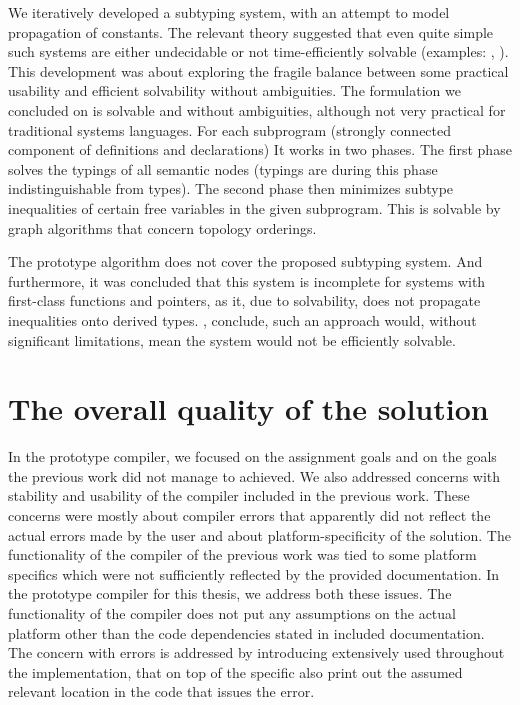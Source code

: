 \begin{description}
    \small
    \item[User-specifiable semantics of constants] We iteratively developed a subtyping system, with an attempt to model propagation of constants. The relevant theory suggested that even quite simple such systems are either undecidable or not time-efficiently solvable (examples: \cite{tiuryn1992subtype}, \cite{frey1997subtype}). This development was about  exploring the fragile balance between some practical usability and efficient solvability without ambiguities. The formulation we concluded on is solvable and without ambiguities, although not very practical for traditional systems languages. For each subprogram (strongly connected component of definitions and declarations) It works in two phases. The first phase solves the typings of all semantic nodes (typings are during this phase indistinguishable from types). The second phase then minimizes subtype inequalities of certain free variables in the given subprogram. This is solvable by graph algorithms that concern topology orderings.

    The prototype algorithm does not cover the proposed subtyping system. And furthermore, it was concluded that this system is incomplete for systems with first-class functions and pointers, as it, due to solvability, does not propagate inequalities onto derived types. \cite{tiuryn1992subtype}, \cite{frey1997subtype} conclude, such an approach would, without significant limitations, mean the system would not be efficiently solvable.
\end{description}

\section*{The overall quality of the solution}

In the prototype compiler, we focused on the assignment goals and on the goals the previous work did not manage to achieved. We also addressed concerns with stability and usability of the compiler included in the previous work. These concerns were mostly about compiler errors that apparently did not reflect the actual errors made by the user and about platform-specificity of the solution. The functionality of the compiler of the previous work was tied to some platform specifics which were not sufficiently reflected by the provided documentation. In the prototype compiler for this thesis, we address both these issues. The functionality of the compiler does not put any assumptions on the actual platform other than the code dependencies stated in included documentation. The concern with errors is addressed by introducing  extensively used throughout the implementation, that on top of the specific also print out the assumed relevant location in the code that issues the error.

